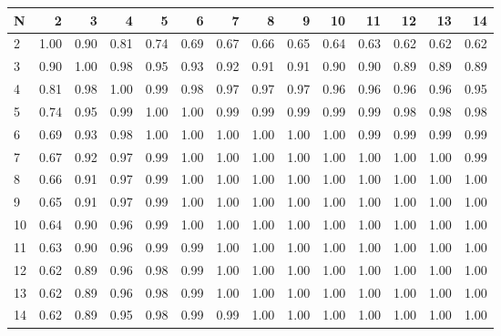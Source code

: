 \begin{tabular}{lrrrrrrrrrrrrr}
\toprule
N &    2  &    3  &    4  &    5  &    6  &    7  &    8  &    9  &    10 &    11 &    12 &    13 &    14 \\
\midrule
2  &  1.00 &  0.90 &  0.81 &  0.74 &  0.69 &  0.67 &  0.66 &  0.65 &  0.64 &  0.63 &  0.62 &  0.62 &  0.62 \\
3  &  0.90 &  1.00 &  0.98 &  0.95 &  0.93 &  0.92 &  0.91 &  0.91 &  0.90 &  0.90 &  0.89 &  0.89 &  0.89 \\
4  &  0.81 &  0.98 &  1.00 &  0.99 &  0.98 &  0.97 &  0.97 &  0.97 &  0.96 &  0.96 &  0.96 &  0.96 &  0.95 \\
5  &  0.74 &  0.95 &  0.99 &  1.00 &  1.00 &  0.99 &  0.99 &  0.99 &  0.99 &  0.99 &  0.98 &  0.98 &  0.98 \\
6  &  0.69 &  0.93 &  0.98 &  1.00 &  1.00 &  1.00 &  1.00 &  1.00 &  1.00 &  0.99 &  0.99 &  0.99 &  0.99 \\
7  &  0.67 &  0.92 &  0.97 &  0.99 &  1.00 &  1.00 &  1.00 &  1.00 &  1.00 &  1.00 &  1.00 &  1.00 &  0.99 \\
8  &  0.66 &  0.91 &  0.97 &  0.99 &  1.00 &  1.00 &  1.00 &  1.00 &  1.00 &  1.00 &  1.00 &  1.00 &  1.00 \\
9  &  0.65 &  0.91 &  0.97 &  0.99 &  1.00 &  1.00 &  1.00 &  1.00 &  1.00 &  1.00 &  1.00 &  1.00 &  1.00 \\
10 &  0.64 &  0.90 &  0.96 &  0.99 &  1.00 &  1.00 &  1.00 &  1.00 &  1.00 &  1.00 &  1.00 &  1.00 &  1.00 \\
11 &  0.63 &  0.90 &  0.96 &  0.99 &  0.99 &  1.00 &  1.00 &  1.00 &  1.00 &  1.00 &  1.00 &  1.00 &  1.00 \\
12 &  0.62 &  0.89 &  0.96 &  0.98 &  0.99 &  1.00 &  1.00 &  1.00 &  1.00 &  1.00 &  1.00 &  1.00 &  1.00 \\
13 &  0.62 &  0.89 &  0.96 &  0.98 &  0.99 &  1.00 &  1.00 &  1.00 &  1.00 &  1.00 &  1.00 &  1.00 &  1.00 \\
14 &  0.62 &  0.89 &  0.95 &  0.98 &  0.99 &  0.99 &  1.00 &  1.00 &  1.00 &  1.00 &  1.00 &  1.00 &  1.00 \\
\bottomrule
\end{tabular}
